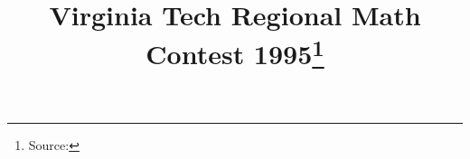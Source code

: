 \documentclass[10pt]{article}
\begin{document}
\title{Virginia Tech Regional Math Contest 1995\footnote{Source: \source}}
\author{\vspace{-2ex}}
\date{\vspace{-6ex}} %
\maketitle







\end{document}
